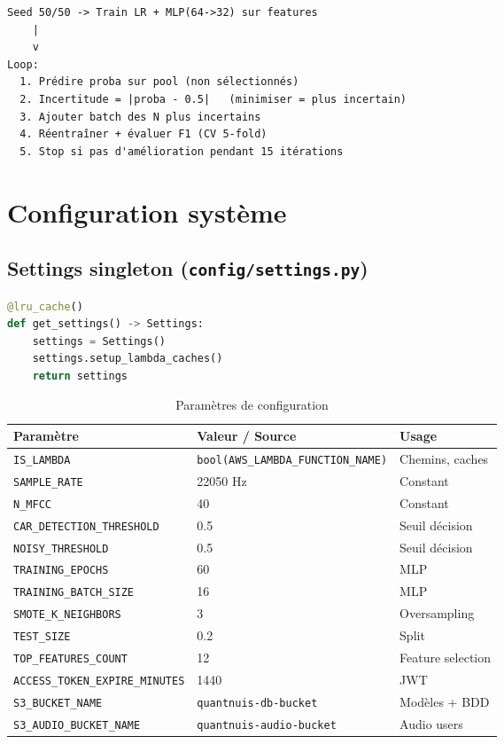 \documentclass[11pt,a4paper]{article}
\newcommand{\code}[1]{\texttt{\small #1}}
\begin{document}
\begin{lstlisting}[style=tree,caption={Uncertainty Sampling — algorithme}]
Seed 50/50 -> Train LR + MLP(64->32) sur features
    |
    v
Loop:
  1. Prédire proba sur pool (non sélectionnés)
  2. Incertitude = |proba - 0.5|   (minimiser = plus incertain)
  3. Ajouter batch des N plus incertains
  4. Réentraîner + évaluer F1 (CV 5-fold)
  5. Stop si pas d'amélioration pendant 15 itérations
\end{lstlisting}

\section{Configuration système}

\subsection{Settings singleton (\texttt{config/settings.py})}

\begin{lstlisting}[language=Python,caption={Pattern singleton}]
@lru_cache()
def get_settings() -> Settings:
    settings = Settings()
    settings.setup_lambda_caches()
    return settings
\end{lstlisting}

\begin{table}[htbp]
\centering
\begin{tabular}{@{}lll@{}}
\toprule
\textbf{Paramètre} & \textbf{Valeur / Source} & \textbf{Usage} \\
\midrule
\code{IS\_LAMBDA} & \code{bool(AWS\_LAMBDA\_FUNCTION\_NAME)} & Chemins, caches \\
\code{SAMPLE\_RATE} & 22050 Hz & Constant \\
\code{N\_MFCC} & 40 & Constant \\
\code{CAR\_DETECTION\_THRESHOLD} & 0.5 & Seuil décision \\
\code{NOISY\_THRESHOLD} & 0.5 & Seuil décision \\
\code{TRAINING\_EPOCHS} & 60 & MLP \\
\code{TRAINING\_BATCH\_SIZE} & 16 & MLP \\
\code{SMOTE\_K\_NEIGHBORS} & 3 & Oversampling \\
\code{TEST\_SIZE} & 0.2 & Split \\
\code{TOP\_FEATURES\_COUNT} & 12 & Feature selection \\
\code{ACCESS\_TOKEN\_EXPIRE\_MINUTES} & 1440 & JWT \\
\code{S3\_BUCKET\_NAME} & \code{quantnuis-db-bucket} & Modèles + BDD \\
\code{S3\_AUDIO\_BUCKET\_NAME} & \code{quantnuis-audio-bucket} & Audio users \\
\bottomrule
\end{tabular}
\caption{Paramètres de configuration}
\end{table}
\end{document}
